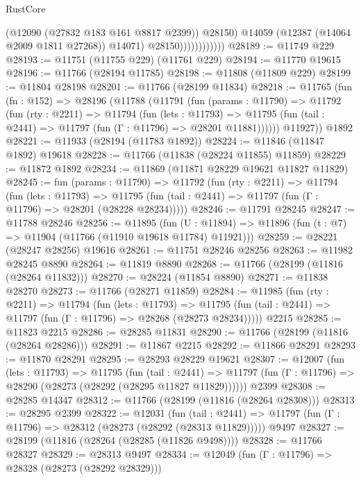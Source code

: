 \begin{lexlean}{RustCore}
\begin{coremodule}
                                (@12090 (@27832 @183 @161 @8817 @2399))
                                @28150)
                              @14059
                              (@12387 (@14064 @2009 @1811 @27268))
                              @14071)
                            @28150))))))))))))
@28189 := @11749 @229
@28193 := @11751 (@11755 @229) (@11761 @229)
@28194 := @11770 @19615
@28196 := @11766 (@28194 @11785)
@28198 := @11808 (@11809 @229)
@28199 := @11804 @28198
@28201 := @11766 (@28199 @11834)
@28218 := @11765
    (fun (fn : @152) =>
    @28196
      (@11788
        (@11791
          (fun (params : @11790) =>
          @11792
            (fun (rty : @2211) =>
            @11794
              (fun (lets : @11793) =>
              @11795 (fun (tail : @2441) => @11797 (fun (Γ : @11796) => @28201 @11881))))))
        @11927))
    @1892
@28221 := @11933 (@28194 (@11783 @1892))
@28224 := @11846 (@11847 @1892) @19618
@28228 := @11766 (@11838 (@28224 @11855) @11859)
@28229 := @11872 @1892
@28234 := @11869 (@11871 @28229 @19621 @11827 @11829)
@28245 := fun (params : @11790) =>
  @11792
    (fun (rty : @2211) =>
    @11794
      (fun (lets : @11793) =>
      @11795 (fun (tail : @2441) => @11797 (fun (Γ : @11796) => @28201 (@28228 @28234)))))
@28246 := @11791 @28245
@28247 := @11788 @28246
@28256 := @11895
    (fun (U : @11894) => @11896 (fun (t : @7) => @11904 (@11766 (@11910 @19618 @11784) @11921)))
@28259 := @28221 (@28247 @28256) @19616
@28261 := @11751 @28246 @28256
@28263 := @11982 @28245 @8890
@28264 := @11819 @8890
@28268 := @11766 (@28199 (@11816 (@28264 @11832)))
@28270 := @28224 (@11854 @8890)
@28271 := @11838 @28270
@28273 := @11766 (@28271 @11859)
@28284 := @11985
    (fun (rty : @2211) =>
    @11794
      (fun (lets : @11793) =>
      @11795 (fun (tail : @2441) => @11797 (fun (Γ : @11796) => @28268 (@28273 @28234)))))
    @2215
@28285 := @11823 @2215
@28286 := @28285 @11831
@28290 := @11766 (@28199 (@11816 (@28264 @28286)))
@28291 := @11867 @2215
@28292 := @11866 @28291
@28293 := @11870 @28291
@28295 := @28293 @28229 @19621
@28307 := @12007
    (fun (lets : @11793) =>
    @11795
      (fun (tail : @2441) =>
      @11797 (fun (Γ : @11796) => @28290 (@28273 (@28292 (@28295 @11827 @11829))))))
    @2399
@28308 := @28285 @14347
@28312 := @11766 (@28199 (@11816 (@28264 @28308)))
@28313 := @28295 @2399
@28322 := @12031
    (fun (tail : @2441) => @11797 (fun (Γ : @11796) => @28312 (@28273 (@28292 (@28313 @11829)))))
    @9497
@28327 := @28199 (@11816 (@28264 (@28285 (@11826 @9498))))
@28328 := @11766 @28327
@28329 := @28313 @9497
@28334 := @12049 (fun (Γ : @11796) => @28328 (@28273 (@28292 @28329)))

\end{coremodule}
\end{lexlean}
